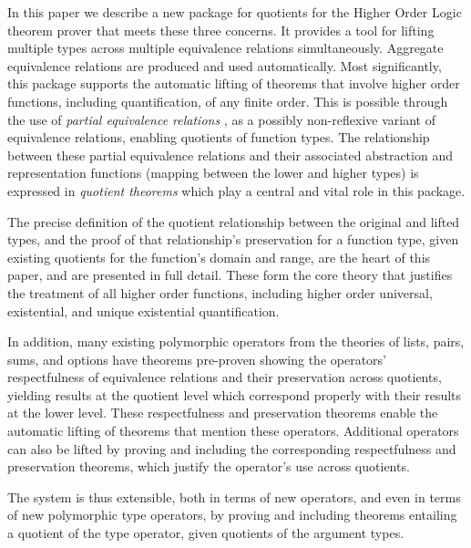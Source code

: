 \documentclass[envcountsame,runningheads]{llncs}
\newcommand{\quotient}{partial equivalence}
\begin{document}
In this paper we describe a new package for quotients for the Higher Order
Logic theorem prover that meets these three concerns.  It provides a tool
for lifting multiple types across multiple equivalence relations simultaneously.
Aggregate equivalence relations are produced and used automatically.
Most significantly,
this package supports the automatic
lifting of theorems that involve higher order functions, including
quantification, of any finite order. 
This is possible through the use of
{\it \quotient{} relations}
\cite{Rob89},
as a possibly non-reflexive variant of
equivalence relations, enabling
quotients
of function types.
The relationship between these \quotient{} relations and their
associated abstraction and representation functions (mapping between the 
lower and higher types)
is expressed in {\it quotient theorems\/} which
play a central
and vital
role in this
package.

The precise definition of the quotient relationship between the
original and lifted types, and the proof of that relationship's
preservation
for a function type,
given existing quotients
for the function's domain and range, are the heart of this paper,
and are presented in full detail.
These
form the core theory that
justifies the treatment of all higher order functions,
including higher order 
universal, existential, and unique existential quantification.

In addition, many existing polymorphic operators from the theories of
lists, pairs, sums, and options have theorems pre-proven
showing the operators' respectfulness of equivalence relations and
their preservation across quotients, yielding results at the
quotient level which correspond properly with their results at the lower level.
These respectfulness and preservation theorems enable the automatic
lifting of theorems that mention these operators.  Additional operators
can also be lifted by proving
and including
the corresponding respectfulness and preservation
theorems, which justify the operator's use across quotients.

The system is thus extensible, both in terms of new operators, and even
in terms of new polymorphic type operators, by proving and including
theorems entailing
a quotient
of the type operator,
given quotients
of the
argument types.
\end{document}
